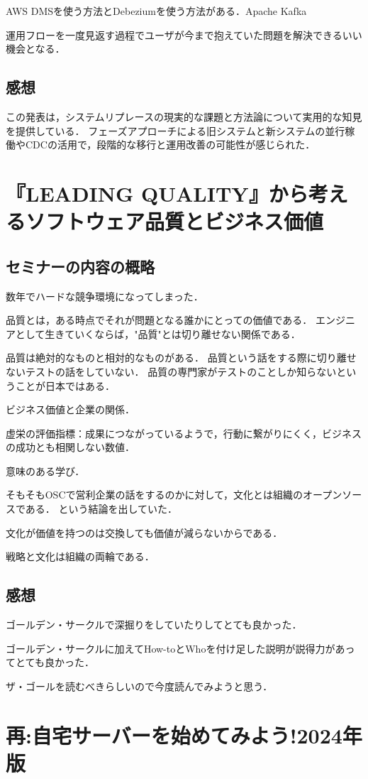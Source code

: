 \documentclass[titlepage,a4paper]{jsarticle}
\begin{document}
AWS DMSを使う方法とDebeziumを使う方法がある．Apache Kafka

運用フローを一度見返す過程でユーザが今まで抱えていた問題を解決できるいい機会となる．
\subsection{感想}
この発表は，システムリプレースの現実的な課題と方法論について実用的な知見を提供している．
フェーズアプローチによる旧システムと新システムの並行稼働やCDCの活用で，段階的な移行と運用改善の可能性が感じられた．
\section{『LEADING QUALITY』から考えるソフトウェア品質とビジネス価値} %
\subsection{セミナーの内容の概略}
数年でハードな競争環境になってしまった．

品質とは，ある時点でそれが問題となる誰かにとっての価値である．
エンジニアとして生きていくならば，"品質"とは切り離せない関係である．

品質は絶対的なものと相対的なものがある．
品質という話をする際に切り離せないテストの話をしていない．
品質の専門家がテストのことしか知らないということが日本ではある．

ビジネス価値と企業の関係．

虚栄の評価指標：成果につながっているようで，行動に繋がりにくく，ビジネスの成功とも相関しない数値．

意味のある学び．

そもそもOSCで営利企業の話をするのかに対して，文化とは組織のオープンソースである．
という結論を出していた．

文化が価値を持つのは交換しても価値が減らないからである．

戦略と文化は組織の両輪である．
\subsection{感想}
ゴールデン・サークルで深掘りをしていたりしてとても良かった．

ゴールデン・サークルに加えてHow-toとWhoを付け足した説明が説得力があってとても良かった．

ザ・ゴールを読むべきらしいので今度読んでみようと思う．
\section{再:自宅サーバーを始めてみよう!2024年版} %
\end{document}
